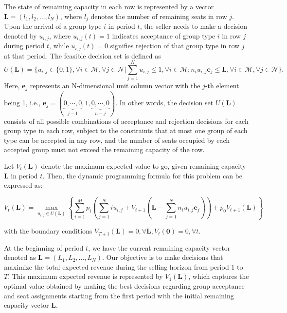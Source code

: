 The state of remaining capacity in each row is represented by a vector $\mathbf{L} = (l_1, l_2, \ldots, l_N)$, where $l_j$ denotes the number of remaining seats in row $j$. Upon the arrival of a group type $i$ in period $t$, the seller needs to make a decision denoted by $u_{i,j}$, where $u_{i,j}(t) = 1$ indicates acceptance of group type $i$ in row $j$ during period $t$, while $u_{i,j}(t) = 0$ signifies rejection of that group type in row $j$ at that period. The feasible decision set is defined as $$U(\mathbf{L}) = \{u_{i,j} \in \{0,1\}, \forall i \in \mathcal{M}, \forall j \in \mathcal{N} | \sum_{j=1}^{N} u_{i,j} \leq 1, \forall i \in \mathcal{M}; n_{i}u_{i,j}\mathbf{e}_j \leq \mathbf{L}, \forall i \in \mathcal{M}, \forall j \in \mathcal{N}\}.$$ Here, $\mathbf{e}_j$ represents an N-dimensional unit column vector with the $j$-th element being 1, i.e., $\mathbf{e}_j = (\underbrace{0, \cdots, 0}_{j-1}, 1, \underbrace{0, \cdots, 0}_{n-j})$. In other words, the decision set $U(\mathbf{L})$ consists of all possible combinations of acceptance and rejection decisions for each group type in each row, subject to the constraints that at most one group of each type can be accepted in any row, and the number of seats occupied by each accepted group must not exceed the remaining capacity of the row.


Let $V_t(\mathbf{L})$ denote the maximum expected value to go, given remaining capacity $\mathbf{L}$ in period $t$. Then, the dynamic programming formula for this problem can be expressed as:

\begin{equation}\label{DP}
V_{t}(\mathbf{L}) = \max_{u_{i,j} \in U(\mathbf{L})}\left\{ \sum_{i=1}^{M} p_i ( \sum_{j=1}^{N} i u_{i,j} + V_{t+1}(\mathbf{L}- \sum_{j=1}^{N} n_i u_{i,j}\mathbf{e}_j)) + p_0 V_{t+1}(\mathbf{L})\right\}
\end{equation}

with the boundary conditions $V_{T+1}(\mathbf{L}) = 0, \forall \mathbf{L}, V_{t}(\mathbf{0}) =0, \forall t$.

At the beginning of period $t$, we have the current remaining capacity vector denoted as $\mathbf{L} = (L_1, L_2, \ldots, L_N)$. Our objective is to make decisions that maximize the total expected revenue during the selling horizon from period 1 to $T$. This maximum expected revenue is represented by $V_1(\mathbf{L})$, which captures the optimal value obtained by making the best decisions regarding group acceptance and seat assignments starting from the first period with the initial remaining capacity vector $\mathbf{L}$.

